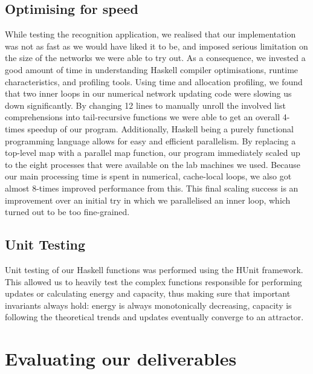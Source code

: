 \subsection{Optimising for speed}

While testing the recognition application, we realised that our implementation was not as fast as we would have liked it to be, and imposed serious limitation on the size of the networks we were able to try out.
As a consequence, we invested a good amount of time in understanding Haskell compiler optimisations, runtime characteristics, and profiling tools. Using time and allocation profiling, we found that two inner loops in our numerical network updating code were slowing us down significantly. By changing 12 lines to manually unroll the involved list comprehensions into tail-recursive functions we were able to get an overall 4-times speedup of our program.
Additionally, Haskell being a purely functional programming language allows for easy and efficient parallelism.
By replacing a top-level map with a parallel map function, our program immediately scaled up to the eight processes that were available on the lab machines we used. Because our main processing time is spent in numerical, cache-local loops, we also got almost 8-times improved performance from this. This final scaling success is an improvement over an initial try in which we parallelised an inner loop, which turned out to be too fine-grained.


\subsection{Unit Testing}

Unit testing of our Haskell functions was performed using the HUnit framework. This allowed us to heavily test the complex functions responsible for performing updates or calculating energy and capacity, thus making sure that important invariants always hold: energy is always monotonically decreasing, capacity is following the theoretical trends and updates eventually converge to an attractor.


\section{Evaluating our deliverables}

